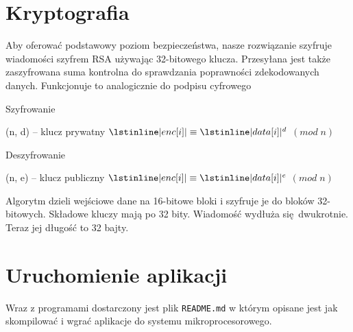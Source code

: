 \documentclass[12pt]{article}
\begin{document}
	 \section{Kryptografia}
	 	Aby oferować podstawowy poziom bezpieczeństwa, nasze rozwiązanie szyfruje wiadomości szyfrem RSA używając 32-bitowego klucza. Przesyłana jest także zaszyfrowana suma kontrolna do sprawdzania poprawności zdekodowanych danych. Funkcjonuje to analogicznie do podpisu cyfrowego

		\begin{algorithm}[H]
			\caption{Szyfrowanie}
			\begin{algorithmic}[1]
				\State (n, d) -- klucz prywatny
				\State $\lstinline|enc[i]| \equiv \lstinline|data[i]|^d$ $(mod \; n)$
				\EndFor
				\EndFunction
			\end{algorithmic}
		\end{algorithm}
		
		\begin{algorithm}[H]
			\caption{Deszyfrowanie}
			\begin{algorithmic}[1]
				\State (n, e) -- klucz publiczny
				\State $\lstinline|enc[i]| \equiv \lstinline|data[i]|^e$ $(mod \; n)$
				\EndFor
				\EndFunction
			\end{algorithmic}
		\end{algorithm}
		
	 	Algorytm dzieli wejściowe dane na 16-bitowe bloki i szyfruje je do bloków 32-bitowych. Składowe kluczy mają po 32 bity. Wiadomość wydłuża się dwukrotnie. Teraz jej długość to 32 bajty.
	 	
	 \section{Uruchomienie aplikacji}
	 	Wraz z programami dostarczony jest plik \lstinline|README.md| w którym opisane jest jak skompilować i wgrać aplikacje do systemu mikroprocesorowego.

	 
\end{document}
